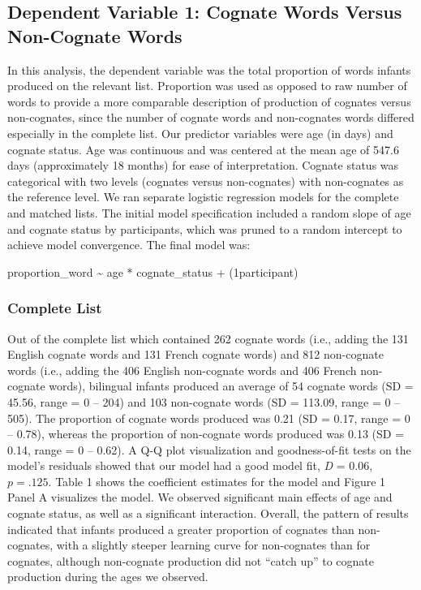 \documentclass[
  english,
  ,man,floatsintext]{apa6}
\begin{document}
\hypertarget{dependent-variable-1-cognate-words-versus-non-cognate-words}{%
\subsection{Dependent Variable 1: Cognate Words Versus Non-Cognate Words}\label{dependent-variable-1-cognate-words-versus-non-cognate-words}}

In this analysis, the dependent variable was the total proportion of words infants produced on the relevant list. Proportion was used as opposed to raw number of words to provide a more comparable description of production of cognates versus non-cognates, since the number of cognate words and non-cognates words differed especially in the complete list. Our predictor variables were age (in days) and cognate status. Age was continuous and was centered at the mean age of 547.6 days (approximately 18 months) for ease of interpretation. Cognate status was categorical with two levels (cognates versus non-cognates) with non-cognates as the reference level. We ran separate logistic regression models for the complete and matched lists. The initial model specification included a random slope of age and cognate status by participants, which was pruned to a random intercept to achieve model convergence. The final model was:

proportion\_word \textasciitilde{} age * cognate\_status + (1\textbar participant)

\hypertarget{complete-list}{%
\subsubsection{Complete List}\label{complete-list}}

Out of the complete list which contained 262 cognate words (i.e., adding the 131 English cognate words and 131 French cognate words) and 812 non-cognate words (i.e., adding the 406 English non-cognate words and 406 French non-cognate words), bilingual infants produced an average of 54 cognate words (SD = 45.56, range = 0 -- 204) and 103 non-cognate words (SD = 113.09, range = 0 -- 505). The proportion of cognate words produced was 0.21 (SD = 0.17, range = 0 -- 0.78), whereas the proportion of non-cognate words produced was 0.13 (SD = 0.14, range = 0 -- 0.62). A Q-Q plot visualization and goodness-of-fit tests on the model's residuals showed that our model had a good model fit, \emph{D} = 0.06, \(p = .125\). Table 1 shows the coefficient estimates for the model and Figure 1 Panel A visualizes the model. We observed significant main effects of age and cognate status, as well as a significant interaction. Overall, the pattern of results indicated that infants produced a greater proportion of cognates than non-cognates, with a slightly steeper learning curve for non-cognates than for cognates, although non-cognate production did not ``catch up'' to cognate production during the ages we observed.
\end{document}

